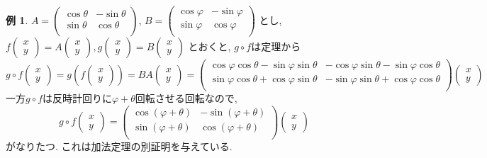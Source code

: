 \documentclass[dvipdfmx,a4paper,11pt]{article}
\theoremstyle{definition}
\newtheorem{exa}[thm]{例}
\begin{document}
 
 \begin{exa}
$
A=\begin{pmatrix}
\cos \theta & -\sin \theta\\
\sin \theta& \cos \theta  \\
\end{pmatrix}
$, 
$
B=
\begin{pmatrix}
\cos \varphi & -\sin \varphi \\
\sin \varphi & \cos \varphi  \\
\end{pmatrix}
$
とし, 
$
f\begin{pmatrix}
x \\ y
 \end{pmatrix} 
 =
 A
\begin{pmatrix}
x \\ y
 \end{pmatrix},
g\begin{pmatrix}
x \\ y
 \end{pmatrix} 
 =
 B
\begin{pmatrix}
x \\ y
 \end{pmatrix}  
$
とおくと, $g \circ f$は定理から
 $$
 g\circ f 
 \begin{pmatrix}
x \\ y
 \end{pmatrix}  
 = g \left( 
 f\begin{pmatrix}
x \\ y
 \end{pmatrix} 
 \right)
 =BA\begin{pmatrix}
x \\ y
 \end{pmatrix} 
 =
 \begin{pmatrix}
\cos \varphi \cos \theta  - \sin \varphi \sin \theta 
& -\cos \varphi \sin \theta - \sin \varphi \cos \theta \\
\sin \varphi \cos \theta + \cos \varphi \sin \theta
& - \sin \varphi \sin \theta  + \cos \varphi \cos \theta \\
\end{pmatrix}
  \begin{pmatrix}
x \\ y
 \end{pmatrix} 
 $$
一方$g \circ f$は反時計回りに$\varphi + \theta$回転させる回転なので,
$$
 g\circ f 
 \begin{pmatrix}
x \\ y
 \end{pmatrix}  
 =
 \begin{pmatrix}
\cos (\varphi  + \theta)& -\sin (\varphi  + \theta)\\
\sin (\varphi  + \theta)& \cos (\varphi  + \theta)  \\
\end{pmatrix}
   \begin{pmatrix}
x \\ y
 \end{pmatrix} 
$$
がなりたつ. これは加法定理の別証明を与えている. 
\end{exa}
\end{document}
